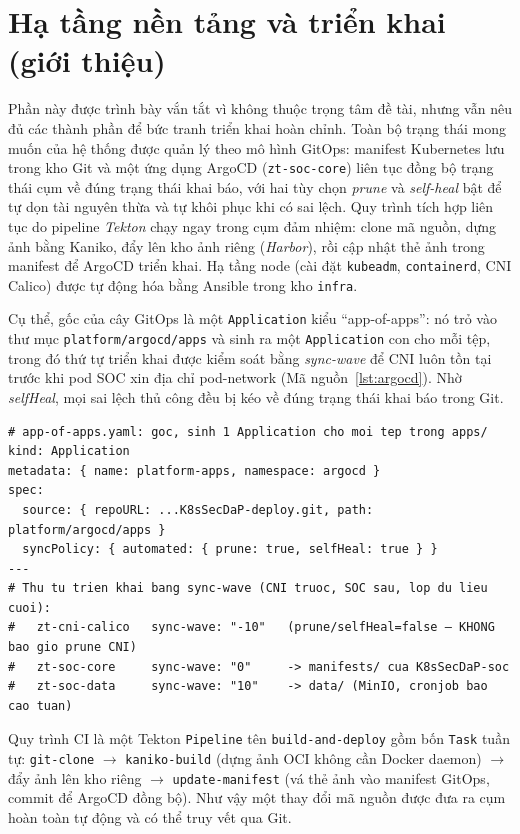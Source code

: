 \section{Hạ tầng nền tảng và triển khai (giới thiệu)}
\label{sec:impl-platform}

Phần này được trình bày vắn tắt vì không thuộc trọng tâm đề tài, nhưng vẫn nêu đủ các
thành phần để bức tranh triển khai hoàn chỉnh. Toàn bộ trạng thái mong muốn của hệ
thống được quản lý theo mô hình GitOps: manifest Kubernetes lưu trong kho Git và một
ứng dụng ArgoCD (\texttt{zt-soc-core}) liên tục đồng bộ trạng thái cụm về đúng trạng
thái khai báo, với hai tùy chọn \textit{prune} và \textit{self-heal} bật để tự dọn tài
nguyên thừa và tự khôi phục khi có sai lệch. Quy trình tích hợp liên tục do pipeline
\emph{Tekton} chạy ngay trong cụm đảm nhiệm: clone mã nguồn, dựng ảnh bằng Kaniko,
đẩy lên kho ảnh riêng (\emph{Harbor}), rồi cập nhật thẻ ảnh trong manifest để ArgoCD
triển khai. Hạ tầng node (cài đặt \texttt{kubeadm}, \texttt{containerd}, CNI Calico)
được tự động hóa bằng Ansible trong kho \texttt{infra}.

Cụ thể, gốc của cây GitOps là một \texttt{Application} kiểu ``app-of-apps'': nó trỏ vào
thư mục \texttt{platform/argocd/apps} và sinh ra một \texttt{Application} con cho mỗi
tệp, trong đó thứ tự triển khai được kiểm soát bằng \emph{sync-wave} để CNI luôn tồn
tại trước khi pod SOC xin địa chỉ pod-network (Mã nguồn~\ref{lst:argocd}). Nhờ
\textit{selfHeal}, mọi sai lệch thủ công đều bị kéo về đúng trạng thái khai báo trong
Git.

\begin{lstlisting}[language={},caption={Gốc GitOps ``app-of-apps'' và thứ tự sync-wave của các ứng dụng con (\texttt{platform/argocd/}).},label={lst:argocd}]
# app-of-apps.yaml: goc, sinh 1 Application cho moi tep trong apps/
kind: Application
metadata: { name: platform-apps, namespace: argocd }
spec:
  source: { repoURL: ...K8sSecDaP-deploy.git, path: platform/argocd/apps }
  syncPolicy: { automated: { prune: true, selfHeal: true } }
---
# Thu tu trien khai bang sync-wave (CNI truoc, SOC sau, lop du lieu cuoi):
#   zt-cni-calico   sync-wave: "-10"   (prune/selfHeal=false — KHONG bao gio prune CNI)
#   zt-soc-core     sync-wave: "0"     -> manifests/ cua K8sSecDaP-soc
#   zt-soc-data     sync-wave: "10"    -> data/ (MinIO, cronjob bao cao tuan)
\end{lstlisting}

Quy trình CI là một Tekton \texttt{Pipeline} tên \texttt{build-and-deploy} gồm bốn
\texttt{Task} tuần tự: \texttt{git-clone} $\rightarrow$ \texttt{kaniko-build} (dựng ảnh
OCI không cần Docker daemon) $\rightarrow$ đẩy ảnh lên kho riêng $\rightarrow$
\texttt{update-manifest} (vá thẻ ảnh vào manifest GitOps, commit để ArgoCD đồng bộ).
Như vậy một thay đổi mã nguồn được đưa ra cụm hoàn toàn tự động và có thể truy vết qua
Git.

